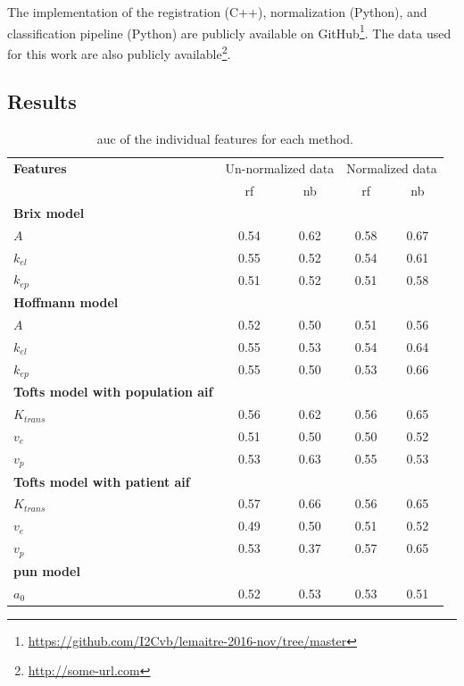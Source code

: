 The implementation of the registration (C++), normalization (Python), and classification pipeline (Python) are publicly available on GitHub\footnote{\url{https://github.com/I2Cvb/lemaitre-2016-nov/tree/master}}.
The data used for this work are also publicly available\footnote{\url{http://some-url.com}}.

\subsection{Results}

\begin{table}
  \caption{\acs*{auc} of the individual features for each method.}
  \centering
  \begin{tabular}{l c c c c}
    \toprule
    \textbf{Features} & \multicolumn{2}{c}{Un-normalized data} & \multicolumn{2}{c}{Normalized data} \\
    & \acs*{rf} & \acs*{nb} & \acs*{rf} & \acs*{nb} \\
    \midrule
    \textbf{Brix model} & & & & \\
    \quad $A$         & 0.54 & 0.62 & 0.58 & 0.67 \\
    \quad $k_{el}$    & 0.55 & 0.52 & 0.54 & 0.61 \\
    \quad $k_{ep}$    & 0.51 & 0.52 & 0.51 & 0.58 \\
    \textbf{Hoffmann model} & & & & \\
    \quad $A$         & 0.52 & 0.50 & 0.51 & 0.56 \\
    \quad $k_{el}$    & 0.55 & 0.53 & 0.54 & 0.64 \\
    \quad $k_{ep}$    & 0.55 & 0.50 & 0.53 & 0.66 \\
    \textbf{Tofts model with population \ac{aif}} & & & & \\
    \quad $K_{trans}$ & 0.56 & 0.62 & 0.56 & 0.65 \\
    \quad $v_{e}$     & 0.51 & 0.50 & 0.50 & 0.52 \\
    \quad $v_{p}$     & 0.53 & 0.63 & 0.55 & 0.53 \\
    \textbf{Tofts model with patient \ac{aif}} & & & & \\
    \quad $K_{trans}$ & 0.57 & 0.66 & 0.56 & 0.65 \\
    \quad $v_{e}$     & 0.49 & 0.50 & 0.51 & 0.52 \\
    \quad $v_{p}$     & 0.53 & 0.37 & 0.57 & 0.65 \\
    \textbf{\ac{pun} model} & & & & \\
    \quad $a_0$       & 0.52 & 0.53 & 0.53 & 0.51  \\

\end{tabular}
\end{table}
